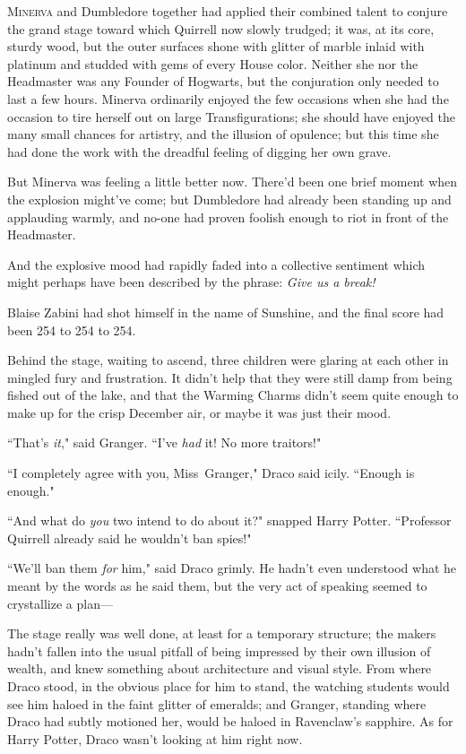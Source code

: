 
\lettrine{M}{inerva} and Dumbledore together had applied their combined talent to conjure the grand stage toward which Quirrell now slowly trudged; it was, at its core, sturdy wood, but the outer surfaces shone with glitter of marble inlaid with platinum and studded with gems of every House color. Neither she nor the Headmaster was any Founder of Hogwarts, but the conjuration only needed to last a few hours. Minerva ordinarily enjoyed the few occasions when she had the occasion to tire herself out on large Transfigurations; she should have enjoyed the many small chances for artistry, and the illusion of opulence; but this time she had done the work with the dreadful feeling of digging her own grave.

But Minerva was feeling a little better now. There'd been one brief moment when the explosion might've come; but Dumbledore had already been standing up and applauding warmly, and no-one had proven foolish enough to riot in front of the Headmaster.

And the explosive mood had rapidly faded into a collective sentiment which might perhaps have been described by the phrase: \emph{Give us a break!}

Blaise Zabini had shot himself in the name of Sunshine, and the final score had been 254 to 254 to 254.

\later

Behind the stage, waiting to ascend, three children were glaring at each other in mingled fury and frustration. It didn't help that they were still damp from being fished out of the lake, and that the Warming Charms didn't seem quite enough to make up for the crisp December air, or maybe it was just their mood.

``That's \emph{it}," said Granger. ``I've \emph{had} it! No more traitors!"

``I completely agree with you, Miss~Granger," Draco said icily. ``Enough is enough."

``And what do \emph{you} two intend to do about it?" snapped Harry Potter. ``Professor Quirrell already said he wouldn't ban spies!"

``We'll ban them \emph{for} him," said Draco grimly. He hadn't even understood what he meant by the words as he said them, but the very act of speaking seemed to crystallize a plan—

\later

The stage really was well done, at least for a temporary structure; the makers hadn't fallen into the usual pitfall of being impressed by their own illusion of wealth, and knew something about architecture and visual style. From where Draco stood, in the obvious place for him to stand, the watching students would see him haloed in the faint glitter of emeralds; and Granger, standing where Draco had subtly motioned her, would be haloed in Ravenclaw's sapphire. As for Harry Potter, Draco wasn't looking at him right now.

